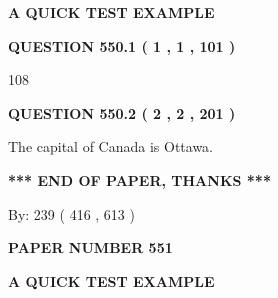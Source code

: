 \documentclass[12pt]{article}
\begin{document}
   
 \vspace{0.2in}
{\LARGE {\textbf{ A QUICK TEST EXAMPLE}}}
   
   
  
\vspace{0.2in}
  
{\textbf{\Large{QUESTION
550.1 
 ( 1 , 1 , 101 )
}}}
  
  
 
 
\noindent{}

108
 
 
  
\vspace{0.2in}
  
{\textbf{\Large{QUESTION
550.2 
 ( 2 , 2 , 201 )
}}}
  
  
 
 
\noindent{}
 
 
The capital of Canada is Ottawa.
 
 
 
 
   
   
 \vspace{0.2in}
 
   
   
   
   
\vspace{1.0in} 
{\textbf{\large{ *** END OF PAPER, THANKS *** }}} 
   
   
\hspace{1.0in} By: 
 239 ( 416 ,  613 )
   
   
   
   
\newpage 
\setcounter{page}{ 
   551001 } 
   
   
   
   
 {\textbf{ \Large{ PAPER NUMBER  551  }}}
   
   
\vspace{0.2in}
   
   
   
   
   
   
 \vspace{0.2in}
{\LARGE {\textbf{ A QUICK TEST EXAMPLE}}}
   
   
  
\vspace{0.2in}
  
\end{document}
